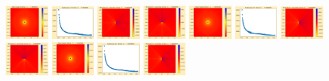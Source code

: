 \documentclass[11pt]{article}
\begin{document}
\includegraphics[width=0.11875\textwidth]{frame0071fig0.png}
\includegraphics[width=0.11875\textwidth]{frame0071fig1.png}
\includegraphics[width=0.11875\textwidth]{frame0071fig2.png}
\includegraphics[width=0.11875\textwidth]{frame0071fig3.png}
\vskip 10pt 
\includegraphics[width=0.11875\textwidth]{frame0072fig0.png}
\includegraphics[width=0.11875\textwidth]{frame0072fig1.png}
\includegraphics[width=0.11875\textwidth]{frame0072fig2.png}
\includegraphics[width=0.11875\textwidth]{frame0072fig3.png}
\includegraphics[width=0.11875\textwidth]{frame0073fig0.png}
\includegraphics[width=0.11875\textwidth]{frame0073fig1.png}
\includegraphics[width=0.11875\textwidth]{frame0073fig2.png}
\end{document}
